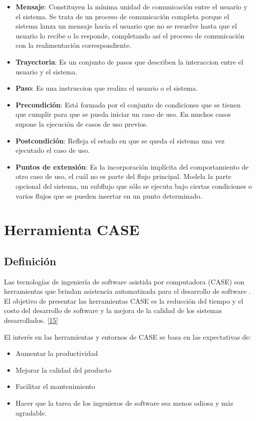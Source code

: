 \begin{itemize}
\item \textbf{Mensaje}: Constituyen la mínima unidad de comunicación entre el usuario y el sistema. Se trata de un proceso de comunicación completa porque el sistema lanza un mensaje hacia el usuario que no se resuelve hasta que el usuario lo recibe o lo responde, completando así el proceso de comunicación con la realimentación correspondiente.

\item \textbf{Trayectoria}: Es un conjunto de pasos que describen la interaccion entre el usuario y el sistema.

\item \textbf{Paso}: Es una instruccion que realiza el usuario o el sistema.

\item \textbf{Precondición}: Está formada por el conjunto de condiciones que se tienen que cumplir para que se pueda iniciar un caso de uso. En muchos casos supone la ejecución de casos de uso previos.

\item \textbf{Postcondición}: Refleja el estado en que se queda el sistema una vez ejecutado el caso de uso.

\item \textbf{Puntos de extensión}: Es la incorporación implícita del comportamiento de otro caso de uso, el cuál no es parte del flujo principal. Modela la parte opcional del sistema, un subflujo que sólo se ejecuta bajo ciertas condiciones o varios flujos que se pueden insertar en un punto determinado. 
\end{itemize}

\section{Herramienta CASE}

\subsection{Definición}

Las tecnologías de ingeniería de software asistida por computadora (CASE) son herramientas que brindan asistencia automatizada para el desarrollo de software . El objetivo de presentar las herramientas CASE es la reducción del tiempo y el costo del desarrollo de software y la mejora de la calidad de los sistemas desarrollados. \hyperlink{b15}{[15]} 

El interés en las herramientas y entornos de CASE se basa en las expectativas de:
\begin{itemize}
	\item Aumentar la productividad
	\item Mejorar la calidad del producto
	\item Facilitar el mantenimiento
	\item Hacer que la tarea de los ingenieros de software sea menos odiosa y más agradable. 
\end{itemize}

